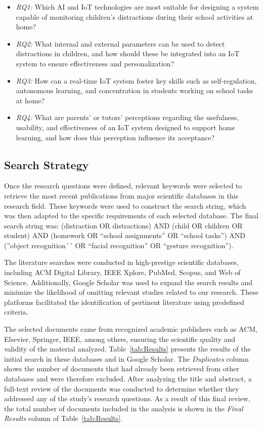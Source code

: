 			\begin{itemize}
				\item \textit{RQ1:} Which AI and IoT technologies are most suitable for designing a system capable of monitoring children’s distractions during their school activities at home?
				
				\item \textit{RQ2:} What internal and external parameters can be used to detect distractions in children, and how should these be integrated into an IoT system to ensure effectiveness and personalization?
				
				\item \textit{RQ3:} How can a real-time IoT system foster key skills such as self-regulation, autonomous learning, and concentration in students working on school tasks at home?
				
				\item \textit{RQ4:} What are parents’ or tutors’ perceptions regarding the usefulness, usability, and effectiveness of an IoT system designed to support home learning, and how does this perception influence its acceptance?
			\end{itemize}
					
		\subsection{Search Strategy}
			Once the research questions were defined, relevant keywords were selected to retrieve the most recent publications from major scientific databases in this research field. These keywords were used to construct the search string, which was then adapted to the specific requirements of each selected database. The final search string was: (distraction OR distractions) AND (child OR children OR student) AND (homework OR ``school assignments'' OR ``school tasks'') AND (''object recognition´´ OR ``facial recognition'' OR ``gesture recognition'').
			
			The literature searches were conducted in high-prestige scientific databases, including ACM Digital Library, IEEE Xplore, PubMed, Scopus, and Web of Science. Additionally, Google Scholar was used to expand the search results and minimize the likelihood of omitting relevant studies related to our research. These platforms facilitated the identification of pertinent literature using predefined criteria.
			
			The selected documents came from recognized academic publishers such as ACM, Elsevier, Springer, IEEE, among others, ensuring the scientific quality and validity of the material analyzed. Table~\ref{tab:Results} presents the results of the initial search in these databases and in Google Scholar. The \textit{Duplicates} column shows the number of documents that had already been retrieved from other databases and were therefore excluded. After analyzing the title and abstract, a full-text review of the documents was conducted to determine whether they addressed any of the study's research questions. As a result of this final review, the total number of documents included in the analysis is shown in the \textit{Final Results} column of Table~\ref{tab:Results}.
			
